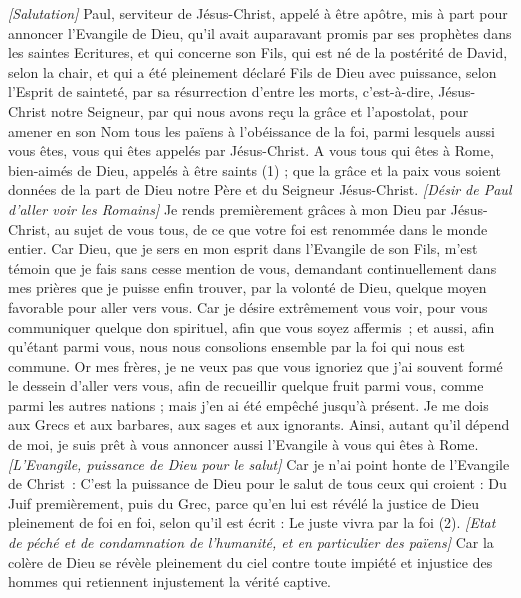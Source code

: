 \BFont
\begin{multicols}{2}
\textit{[Salutation]}
\VerseOne{}Paul, serviteur de Jésus-Christ, appelé à être apôtre, mis à part pour annoncer l'Evangile de Dieu,
qu’il avait auparavant promis par ses prophètes dans les saintes Ecritures,
et qui concerne son Fils, qui est né de la postérité de David, selon la chair,
et qui a été pleinement déclaré Fils de Dieu avec puissance, selon l'Esprit de sainteté, par sa résurrection d'entre les morts, c'est-à-dire, Jésus-Christ notre Seigneur,
par qui nous avons reçu la grâce et l’apostolat, pour amener en son Nom tous les païens à l’obéissance de la foi,
parmi lesquels aussi vous êtes, vous qui êtes appelés par Jésus-Christ.
A vous tous qui êtes à Rome, bien-aimés de Dieu, appelés à être saints (1) ; que la grâce et la paix vous soient données de la part de Dieu notre Père et du Seigneur Jésus-Christ.
\textit{[Désir de Paul d'aller voir les Romains]}
Je rends premièrement grâces à mon Dieu par Jésus-Christ, au sujet de vous tous, de ce que votre foi est renommée dans le monde entier.
Car Dieu, que je sers en mon esprit dans l'Evangile de son Fils, m'est témoin que je fais sans cesse mention de vous,
demandant continuellement dans mes prières que je puisse enfin trouver, par la volonté de Dieu, quelque moyen favorable pour aller vers vous.
Car je désire extrêmement vous voir, pour vous communiquer quelque don spirituel, afin que vous soyez affermis ;
et aussi, afin qu'étant parmi vous, nous nous consolions ensemble par la foi qui nous est commune.
Or mes frères, je ne veux pas que vous ignoriez que j’ai souvent formé le dessein d'aller vers vous, afin de recueillir quelque fruit parmi vous, comme parmi les autres nations ; mais j'en ai été empêché jusqu'à présent.
Je me dois aux Grecs et aux barbares, aux sages et aux ignorants.
Ainsi, autant qu’il dépend de moi, je suis prêt à vous annoncer aussi l'Evangile à vous qui êtes à Rome.
\textit{[L'Evangile, puissance de Dieu pour le salut]}
Car je n'ai point honte de l'Evangile de Christ : C’est la puissance de Dieu pour le salut de tous ceux qui croient : Du Juif premièrement, puis du Grec,
parce qu’en lui est révélé la justice de Dieu pleinement de foi en foi, selon qu'il est écrit : Le juste vivra par la foi (2).
\textit{[Etat de péché et de condamnation de l'humanité, et en particulier des païens]}
Car la colère de Dieu se révèle pleinement du ciel contre toute impiété et injustice des hommes qui retiennent injustement la vérité captive.

\end{multicols}
